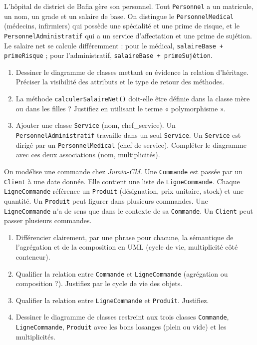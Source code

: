 \documentclass[11pt]{article}
\begin{document}
\begin{exercice}
L'hôpital de district de Bafia gère son personnel. Tout \texttt{Personnel} a un matricule, un nom, un grade et un salaire de base. On distingue le \texttt{PersonnelMedical} (médecins, infirmiers) qui possède une spécialité et une prime de risque, et le \texttt{PersonnelAdministratif} qui a un service d'affectation et une prime de sujétion. Le salaire net se calcule différemment : pour le médical, \texttt{salaireBase + primeRisque} ; pour l'administratif, \texttt{salaireBase + primeSujétion}.
\begin{enumerate}
    \item Dessiner le diagramme de classes mettant en évidence la relation d'héritage. Préciser la visibilité des attributs et le type de retour des méthodes.
    \item La méthode \texttt{calculerSalaireNet()} doit-elle être définie dans la classe mère ou dans les filles ? Justifiez en utilisant le terme « polymorphisme ».
    \item Ajouter une classe \texttt{Service} (nom, chef\_service). Un \texttt{PersonnelAdministratif} travaille dans un seul \texttt{Service}. Un \texttt{Service} est dirigé par un \texttt{PersonnelMedical} (chef de service). Compléter le diagramme avec ces deux associations (nom, multiplicités).
\end{enumerate}
\end{exercice}

\begin{exercice}
On modélise une commande chez \textit{Jumia-CM}. Une \texttt{Commande} est passée par un \texttt{Client} à une date donnée. Elle contient une liste de \texttt{LigneCommande}. Chaque \texttt{LigneCommande} référence un \texttt{Produit} (désignation, prix unitaire, stock) et une quantité. Un \texttt{Produit} peut figurer dans plusieurs commandes. Une \texttt{LigneCommande} n'a de sens que dans le contexte de sa \texttt{Commande}. Un \texttt{Client} peut passer plusieurs commandes.
\begin{enumerate}
    \item Différencier clairement, par une phrase pour chacune, la sémantique de l'agrégation et de la composition en UML (cycle de vie, multiplicité côté conteneur).
    \item Qualifier la relation entre \texttt{Commande} et \texttt{LigneCommande} (agrégation ou composition ?). Justifiez par le cycle de vie des objets.
    \item Qualifier la relation entre \texttt{LigneCommande} et \texttt{Produit}. Justifiez.
    \item Dessiner le diagramme de classes restreint aux trois classes \texttt{Commande}, \texttt{LigneCommande}, \texttt{Produit} avec les bons losanges (plein ou vide) et les multiplicités.
\end{enumerate}
\end{exercice}
\end{document}
